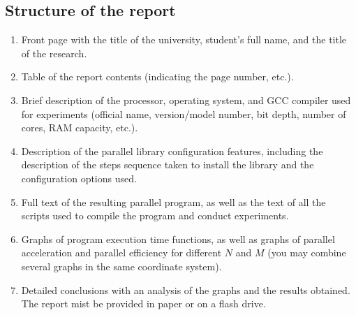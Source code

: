 { %
	\subsection{Structure of the report}
	\begin{enumerate}
		\item Front page with the title of the university, student's full name, and the title of the research.
		\item Table of the report contents (indicating the page number, etc.).
		\item Brief description of the processor, operating system, and GCC compiler used for experiments (official name, version/model number, bit depth, number of cores, RAM capacity, etc.).
		\item Description of the parallel library configuration features, including the description of the steps sequence taken to install the library and the configuration options used.
		\item Full text of the resulting parallel program, as well as the text of all the scripts used to compile the program and conduct experiments.
		\item Graphs of program execution time functions, as well as graphs of parallel acceleration and parallel efficiency for different  $N$ and $M$ (you may combine several graphs in the same coordinate system).
		\item Detailed conclusions with an analysis of the graphs and the results obtained. The report mist be provided in paper or on a flash drive.
	\end{enumerate}
}